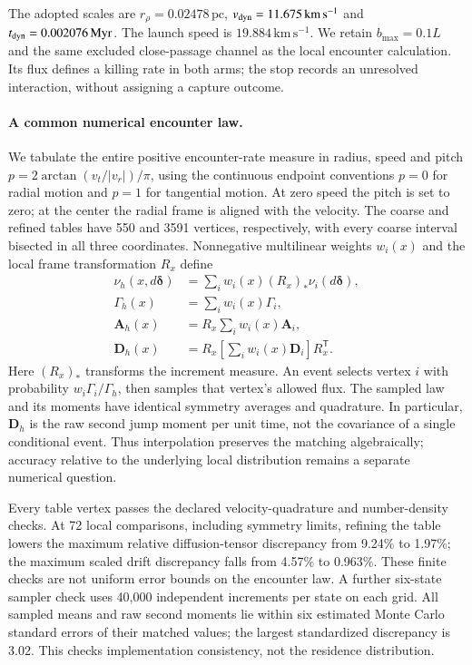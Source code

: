 \documentclass[aps,prd,reprint,amsmath,amssymb,superscriptaddress,nofootinbib,longbibliography,floatfix]{revtex4-2}
\begin{document}
The adopted scales are $r_\rho=0.02478\,\mathrm{pc}$, $v_{\rm dyn}=11.675\,\mathrm{km\,s^{-1}}$ and $t_{\rm dyn}=0.002076\,\mathrm{Myr}$. The launch speed is $19.884\,\mathrm{km\,s^{-1}}$. We retain $b_{\max}=0.1L$ and the same excluded close-passage channel as the local encounter calculation. Its flux defines a killing rate in both arms; the stop records an unresolved interaction, without assigning a capture outcome.

\paragraph{A common numerical encounter law.}
We tabulate the entire positive encounter-rate measure in radius, speed and pitch $p=2\arctan(v_t/|v_r|)/\pi$, using the continuous endpoint conventions $p=0$ for radial motion and $p=1$ for tangential motion. At zero speed the pitch is set to zero; at the center the radial frame is aligned with the velocity. The coarse and refined tables have 550 and 3591 vertices, respectively, with every coarse interval bisected in all three coordinates. Nonnegative multilinear weights $w_i(x)$ and the local frame transformation $R_x$ define
\begin{align}
 \nu_h(x,d\boldsymbol\delta)&=\sum_i w_i(x)(R_x)_*\nu_i(d\boldsymbol\delta),\nonumber\\
 \Gamma_h(x)&=\sum_i w_i(x)\Gamma_i,\nonumber\\
 \mathbf A_h(x)&=R_x\sum_iw_i(x)\mathbf A_i,\nonumber\\
 \mathbf D_h(x)&=R_x\!\left[\sum_iw_i(x)\mathbf D_i\right]R_x^{\mathsf T}.
 \label{eq:interpolated-encounter-law}
\end{align}
Here $(R_x)_*$ transforms the increment measure. An event selects vertex $i$ with probability $w_i\Gamma_i/\Gamma_h$, then samples that vertex's allowed flux. The sampled law and its moments have identical symmetry averages and quadrature. In particular, $\mathbf D_h$ is the raw second jump moment per unit time, not the covariance of a single conditional event. Thus interpolation preserves the matching algebraically; accuracy relative to the underlying local distribution remains a separate numerical question.

Every table vertex passes the declared velocity-quadrature and number-density checks. At 72 local comparisons, including symmetry limits, refining the table lowers the maximum relative diffusion-tensor discrepancy from 9.24\% to 1.97\%; the maximum scaled drift discrepancy falls from 4.57\% to 0.963\%. These finite checks are not uniform error bounds on the encounter law. A further six-state sampler check uses 40,000 independent increments per state on each grid. All sampled means and raw second moments lie within six estimated Monte Carlo standard errors of their matched values; the largest standardized discrepancy is 3.02. This checks implementation consistency, not the residence distribution.
\end{document}

